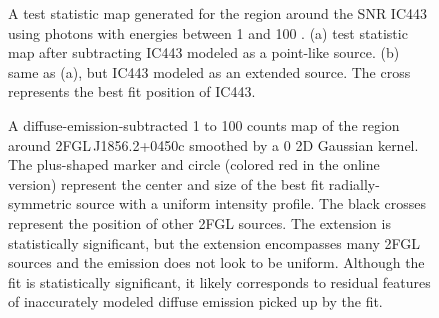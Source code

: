 \documentclass[12pt,preprint]{aastex}
\newif\ifcolorfigure
\newcommand{\gev}{\text{GeV}\xspace}
\begin{document}
\begin{figure}
  \ifcolorfigure
    \plotone{ic443_plots/res_tsmap_ic443_color.eps}
    \else
    \fi

  \caption{
  A test statistic map generated for the region around the SNR 
  IC443 using 
  photons with energies between
  1 \gev and 100 \gev.  (a) test statistic map after
  subtracting IC443 modeled as a point-like source. (b) same as (a), but
  IC443 modeled as an extended source. The cross represents the best
  fit position of IC443.
  }
  \label{res_tsmaps}
\end{figure}

\clearpage
\begin{figure}
    \ifcolorfigure
    \plotone{source_plots/example_bad_fit_color.eps}
    \else
    \fi
    \caption{
    A diffuse-emission-subtracted 1 \gev to 100 \gev counts map of the
    region around 2FGL\,J1856.2+0450c smoothed by a 0 2D Gaussian
    kernel. The plus-shaped marker and circle (colored red in
    the online version) represent the center and size of the best fit
    radially-symmetric source with a uniform intensity profile.  The black
    crosses represent the position of other 2FGL sources.  The extension
    is statistically significant, but the extension encompasses many 2FGL
    sources and the emission does not look to be uniform. Although
    the fit is statistically significant, it likely corresponds to
    residual features of inaccurately modeled diffuse emission picked
    up by the fit. 
    }
    \label{example_bad_fit}
\end{figure}
\end{document}
